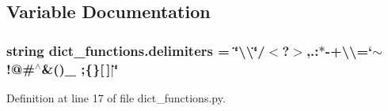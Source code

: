\subsection{Variable Documentation}
\subsubsection[{\texorpdfstring{delimiters}{delimiters}}]{\setlength{\rightskip}{0pt plus 5cm}string dict\+\_\+functions.\+delimiters = \char`\"{}\textbackslash{}\textquotesingle{}\textbackslash{}\char`\"{}/$<$?$>$,.\+:$\ast$-\/+\textbackslash{}\textbackslash{}=`$\sim$!@\#$^\wedge$\&()\+\_\+ ;\{\}\mbox{[}$\,$\mbox{]}$\vert$\char`\"{}}\hypertarget{namespacedict__functions_a5b7d5eaf2a87a18bae901c297cd2f249}{}\label{namespacedict__functions_a5b7d5eaf2a87a18bae901c297cd2f249}


Definition at line 17 of file dict\+\_\+functions.\+py.


